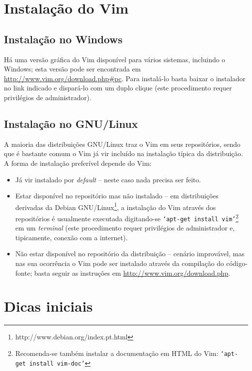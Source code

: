 \section{Instalação do Vim}

\subsection{Instalação no Windows}

Há uma versão gráfica do Vim disponível para vários sistemas, incluindo o Windows;
esta versão pode ser encontrada em \url{http://www.vim.org/download.php#pc}. 
Para instalá-lo basta baixar o instalador no link indicado e dispará-lo com um
duplo clique (este procedimento requer privilégios de administrador).

\subsection{Instalação no GNU/Linux}

A maioria das distribuições GNU/Linux traz o Vim em seus repositórios, sendo
que é bastante comum o Vim já vir incluído na instalação típica da distribuição.
A forma de instalação preferível depende do Vim:
\begin{itemize}
\item Já vir instalado por {\em default} -- neste caso nada precisa ser feito.

\item Estar disponível no repositório mas não instalado -- em distribuições
derivadas da Debian GNU/Linux\footnote{http://www.debian.org/index.pt.html},
a instalação do Vim através dos repositórios é usualmente executada
digitando-se {\tt `apt-get install vim'}\footnote{Recomenda-se também instalar
a documentação em HTML do Vim: {\tt `apt-get install vim-doc'}} em um {\em terminal} (este procedimento
requer privilégios de administrador e, tipicamente, conexão com a internet).

\item Não estar disponível no repositório da distribuição -- cenário
improvável, mas
nas sua ocorrência o Vim pode ser instalado através da compilação do
código-fonte; basta seguir as instruções em \url{http://www.vim.org/download.php}.

\end{itemize}

\section{Dicas iniciais}\label{Dicas iniciais}

